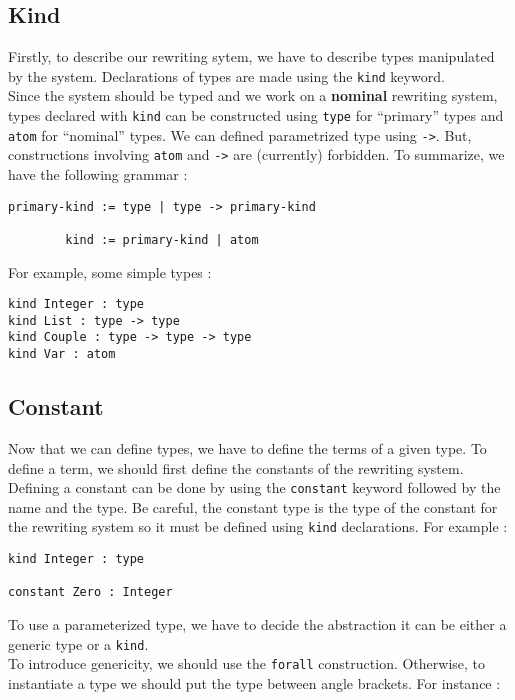 \documentclass[12pt,a4paper]{article}
\begin{document}
\subsection{Kind}
Firstly, to describe our rewriting sytem, we have to describe types
manipulated by the system. Declarations of types are made using the
\verb?kind? keyword.\\
Since the system should be typed and we work on a \textbf{nominal}
rewriting system, types declared with \verb?kind? can be constructed using
\verb?type? for ``primary'' types and \verb?atom? for ``nominal''
types. We can defined parametrized type using \verb?->?. But,
constructions involving \verb?atom? and \verb?->? are (currently) forbidden.
To summarize, we have the following grammar :
\begin{verbatim}
primary-kind := type | type -> primary-kind

        kind := primary-kind | atom
\end{verbatim}

For example, some simple types :
\begin{verbatim}
kind Integer : type
kind List : type -> type
kind Couple : type -> type -> type
kind Var : atom
\end{verbatim}


\subsection{Constant}
Now that we can define types, we have to define the terms of a given type.
To define a term, we should first define the constants of the rewriting
system.\\
Defining a constant can be done by using the \verb?constant? keyword followed
by the name and the type. Be careful, the constant
type is the type of the constant for the rewriting system so it must
be defined using \verb?kind? declarations. For example :

\begin{verbatim}
kind Integer : type

constant Zero : Integer
\end{verbatim}

To use a parameterized type, we have to decide the abstraction it can be
either a generic type or a \verb?kind?.\\
To introduce genericity, we should use the \verb?forall?
construction. Otherwise, to instantiate a type we should put the type
between angle brackets. For instance :
\end{document}
